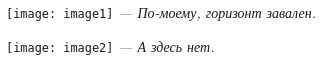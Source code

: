 \documentclass{article}
\begin{document}
\noindent\texttt{[image: image1]}
\emph{--- По-моему, горизонт завален.}

\vspace{22pt}

\noindent\texttt{[image: image2]}
\emph{--- А здесь нет.}
\end{document}
